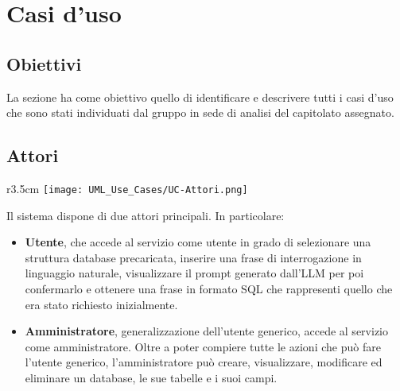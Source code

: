 \section{Casi d'uso}



\subsection{Obiettivi}
La sezione ha come obiettivo quello di identificare e descrivere tutti i casi d'uso che sono stati individuati dal gruppo in sede di analisi del capitolato assegnato.

\subsection{Attori}
\begin{wrapfigure}{r}{3.5cm}
	\texttt{[image: UML\_Use\_Cases/UC-Attori.png]}
\end{wrapfigure}
Il sistema dispone di due attori principali. In particolare:
\begin{itemize}
	\item \textbf{Utente}, che accede al servizio come utente in grado di selezionare una struttura database precaricata, inserire una frase di interrogazione in linguaggio naturale, visualizzare il prompt generato dall'LLM per poi confermarlo e ottenere una frase in formato SQL che rappresenti quello che era stato richiesto inizialmente.
	\item \textbf{Amministratore}, generalizzazione dell'utente generico, accede al servizio come amministratore. Oltre a poter compiere tutte le azioni che può fare l'utente generico, l'amministratore può creare, visualizzare, modificare ed eliminare un database, le sue tabelle e i suoi campi.
\end{itemize}

